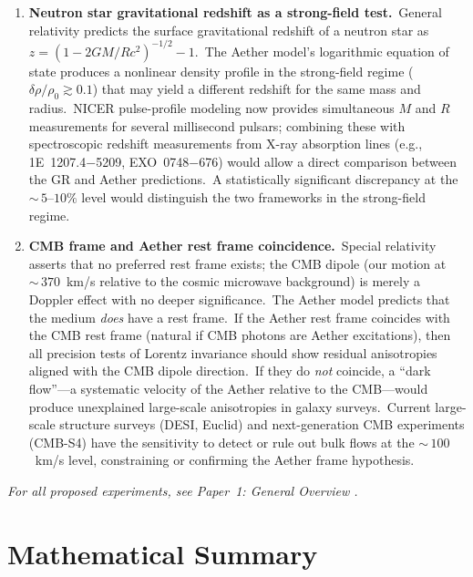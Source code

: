 ﻿\documentclass[12pt,letterpaper]{article}
\begin{document}
\begin{enumerate}[leftmargin=2em]
  \item \textbf{Neutron star gravitational redshift as a strong-field test.}\
    General relativity predicts the surface gravitational redshift of a
    neutron star as $z = (1 - 2GM/Rc^2)^{-1/2} - 1$.\ The Aether model's
    logarithmic equation of state produces a nonlinear density profile in the
    strong-field regime ($\delta\rho/\rho_0 \gtrsim 0.1$) that may yield a
    different redshift for the same mass and radius.\ NICER pulse-profile
    modeling now provides simultaneous $M$ and $R$ measurements for several
    millisecond pulsars; combining these with spectroscopic redshift
    measurements from X-ray absorption lines (e.g., 1E~1207.4$-$5209,
    EXO~0748$-$676) would allow a direct comparison between the GR and Aether
    predictions.\ A statistically significant discrepancy at the
    ${\sim}\,5$--$10\%$ level would distinguish the two frameworks in the
    strong-field regime.

  \item \textbf{CMB frame and Aether rest frame coincidence.}\
    Special relativity asserts that no preferred rest frame exists; the CMB
    dipole (our motion at ${\sim}\,370$~km/s relative to the cosmic microwave
    background) is merely a Doppler effect with no deeper significance.\ The
    Aether model predicts that the medium \emph{does} have a rest frame.\ If
    the Aether rest frame coincides with the CMB rest frame (natural if CMB
    photons are Aether excitations), then all precision tests of Lorentz
    invariance should show residual anisotropies aligned with the CMB dipole
    direction.\ If they do \emph{not} coincide, a ``dark flow''---a
    systematic velocity of the Aether relative to the CMB---would produce
    unexplained large-scale anisotropies in galaxy surveys.\ Current
    large-scale structure surveys (DESI, Euclid) and next-generation CMB
    experiments (CMB-S4) have the sensitivity to detect or rule out bulk
    flows at the ${\sim}\,100$~km/s level, constraining or confirming the
    Aether frame hypothesis.

\end{enumerate}

\noindent\textit{For all proposed experiments, see Paper~1: General Overview \cite{otto-overview}.}


\section{Mathematical Summary}
\end{document}
